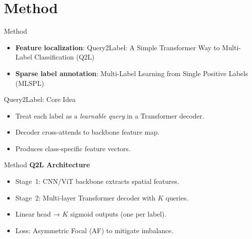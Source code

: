 \section{Method}

\begin{frame}{Method}
  \begin{itemize}
    \item  \textbf{Feature localization}: Query2Label: A Simple Transformer Way to Multi-Label
Classification (Q2L)
    \item \textbf{Sparse label annotation}: Multi-Label Learning from Single Positive Labels (MLSPL)
  \end{itemize}
\end{frame}

\begin{frame}{Query2Label: Core Idea}
  \begin{itemize}
    \item Treat each label as a \emph{learnable query} in a Transformer decoder.
    \item Decoder cross‑attends to backbone feature map.
    \item Produces class‑specific feature vectors.
  \end{itemize}
\end{frame}

\begin{frame}{Method}
  \textbf{Q2L Architecture}
  \begin{itemize}
    \item Stage 1: CNN/ViT backbone extracts spatial features.
    \item Stage 2: Multi‑layer Transformer decoder with $K$ queries.
    \item Linear head → $K$ sigmoid outputs (one per label).
    \item Loss: Asymmetric Focal (AF) to mitigate imbalance.
  \end{itemize}
\end{frame}


